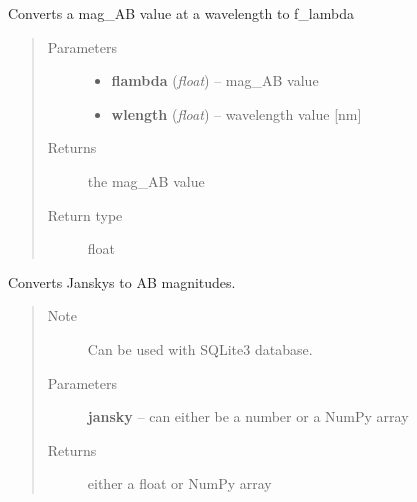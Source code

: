 \documentclass[letterpaper,10pt,english]{sphinxmanual}
\begin{document}
\begin{fulllineitems}
\label{SamPy.astronomy:SamPy.astronomy.conversions.get_magAB_from_flambda}
Converts a mag\_AB value at a wavelength to f\_lambda
\begin{quote}\begin{description}
\item[{Parameters}] \leavevmode\begin{itemize}
\item {} 
\textbf{flambda} (\emph{float}) -- mag\_AB value

\item {} 
\textbf{wlength} (\emph{float}) -- wavelength value {[}nm{]}

\end{itemize}

\item[{Returns}] \leavevmode
the mag\_AB value

\item[{Return type}] \leavevmode
float

\end{description}\end{quote}

\end{fulllineitems}



\begin{fulllineitems}
\label{SamPy.astronomy:SamPy.astronomy.conversions.janskyToMagnitude}
Converts Janskys to AB magnitudes.
\begin{quote}\begin{description}
\item[{Note }] \leavevmode
Can be used with SQLite3 database.

\item[{Parameters}] \leavevmode
\textbf{jansky} -- can either be a number or a NumPy array

\item[{Returns}] \leavevmode
either a float or NumPy array

\end{description}\end{quote}

\end{fulllineitems}
\end{document}
